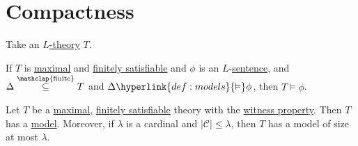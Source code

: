 \documentclass{article}
\let\models\vDash
\newcommand{\named}[1]{\textbf{#1}\index{#1}}
\begin{document}
\section{Compactness}
\begin{ndef}\label{def:5.1}
  Take an \hyperlink{def:ltheory}{$L$-theory} $T$.
\end{ndef}
\begin{nlemma}\label{lem:5.2}
  If $T$ is \hyperlink{def:maximal}{maximal} and \hyperlink{def:fs}{finitely satisfiable} and $\phi$ is an $L$-\hyperlink{def:sentence}{sentence}, and $\Delta \overset{\mathclap{\text{finite}}}\subseteq T$ and $\Delta \hyperlink{def:models}{\models} \phi$, then $T \models \phi$.
\end{nlemma}
\begin{nlemma}\label{lem:5.3}
  Let $T$ be a \hyperlink{def:maximal}{maximal}, \hyperlink{def:fs}{finitely satisfiable} theory with the \hyperlink{def:wp}{witness property}. Then $T$ has a \hyperlink{def:model}{model}.
  Moreover, if $\lambda$ is a cardinal and $|\mathscr{C}| \leq \lambda$, then $T$ has a model of size at most $\lambda$.
\end{nlemma}
\end{document}
